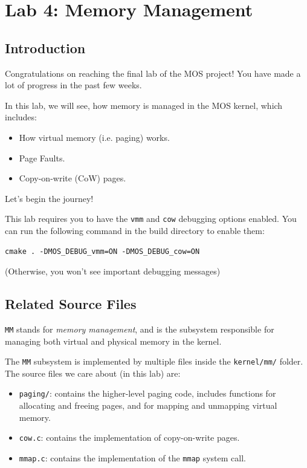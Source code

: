 \chapter{Lab 4: Memory Management}

\section{Introduction}

Congratulations on reaching the final lab of the MOS project! You have
made a lot of progress in the past few weeks.

In this lab, we will see, how memory is managed in the MOS kernel, which includes:

\begin{itemize}
    \item How virtual memory (i.e. paging) works.
    \item Page Faults.
    \item Copy-on-write (CoW) pages.
\end{itemize}

Let's begin the journey!

\begin{note}
    \item This lab requires you to have the \texttt{vmm} and \texttt{cow} debugging options
    enabled. You can run the following command in the build directory to enable them:
    \begin{verbatim}
cmake . -DMOS_DEBUG_vmm=ON -DMOS_DEBUG_cow=ON
    \end{verbatim}
    \item (Otherwise, you won't see important debugging messages)
\end{note}

\section{Related Source Files}

\texttt{MM} stands for \textit{memory management}, and is the subsystem
responsible for managing both virtual and physical memory in the kernel.

The \texttt{MM} subsystem is implemented by multiple files inside the \texttt{kernel/mm/}
folder. The source files we care about (in this lab) are:

\begin{itemize}
    \item \texttt{paging/}: contains the higher-level paging code, includes functions
          for allocating and freeing pages, and for mapping and unmapping virtual
          memory.
    \item \texttt{cow.c}: contains the implementation of copy-on-write pages.
    \item \texttt{mmap.c}: contains the implementation of the \texttt{mmap} system call.
\end{itemize}

